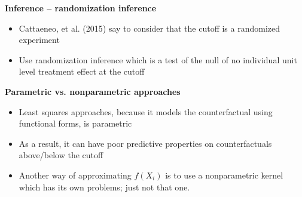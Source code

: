 \documentclass[notes=show]{beamer}
\begin{document}
\begin{frame}[plain]
\begin{center}
\textbf{Inference -- randomization inference}
\end{center}

\begin{itemize}
\item Cattaeneo, et al. (2015) say to consider that the cutoff is a randomized experiment
\item Use randomization inference which is a test of the null of no individual unit level treatment effect at the cutoff
\end{itemize}

\end{frame}



\begin{frame}[plain]
\begin{center}
\textbf{Parametric vs. nonparametric approaches}
\end{center}

\begin{itemize}
\item Least squares approaches, because it models the counterfactual using functional forms, is parametric 
\item As a result, it can have poor predictive properties on counterfactuals above/below the cutoff
\item Another way of approximating $f(X_i)$ is to use a nonparametric kernel which has its own problems; just not that one.
\end{itemize}

\end{frame}
\end{document}
